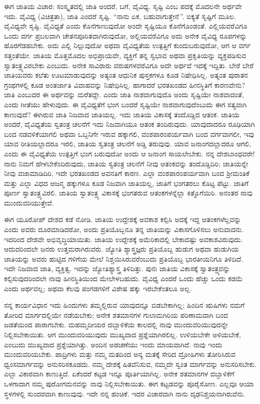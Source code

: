 ಈಗ ಜಾತಿಯ ವಿಚಾರ: ಸಂಸ್ಕೃತದಲ್ಲಿ ಜಾತಿ ಅಂದರೆ, ಬಗೆ, ವೈವಿಧ್ಯ. ಸೃಷ್ಟಿ ಎಂಬ ಪದಕ್ಕೆ ಮೊದಲನೇ ಅರ್ಥವೇ ಇದು. ವೈವಿಧ್ಯ (ವಿಚಿತ್ರತಾ), ಜಾತಿ ಎಂದರೆ ಸೃಷ್ಟಿ. ``ನಾನು ಏಕ, ಬಹುವಾಗುತ್ತೇನೆ\,''. ಐಕ್ಯತೆ ಸೃಷ್ಟಿಗೆ ಮೂಲ. ವೈವಿಧ್ಯವೇ ಸೃಷ್ಟಿ. ವೈವಿಧ್ಯತೆ ಎಂದು ಕೊನೆಗಾಣುವುದೋ ಅಂದೇ ಸೃಷ್ಟಿಯೂ ಕೊನೆಗೊಂಡಂತೆ. ಎಲ್ಲಿಯವರೆವಿಗೂ ಒಂದು ವರ್ಗ  ಪ್ರಬಲವಾಗಿ ಚೇತನಪೂರಿತವಾಗಿರುವುದೋ, ಅಲ್ಲಿಯವರೆವಿಗೂ ಅದು ಅನೇಕ ವೈವಿಧ್ಯ ರೂಪಗಳನ್ನು ಹೊರಗೆಡಹಬೇಕು. ಅದು ಎಲ್ಲಿ ನಿಲ್ಲುವುದೋ ಅಥವಾ ವೈವಿಧ್ಯತೆಯ ಉತ್ಪತ್ತಿಗೆ ಕುಂದುಬರುವುದೋ, ಆಗ ಆ ವರ್ಗ ಸತ್ತಂತೆಯೇ. ಜಾತಿಯ ಮೊತ್ತಮೊದಲ ಅಭಿಪ್ರಾಯವೇ, ವ್ಯಕ್ತಿಗೆ ತನ್ನ ಸ್ವಭಾವ ಅಥವಾ ಪ್ರಕೃತಿಯನ್ನು ವ್ಯಕ್ತಪಡಿಸುವ ಸ್ವಾತಂತ್ರ್ಯವಿರಬೇಕು ಎಂಬುದು. ಅನೇಕ ಸಾವಿರಾರು ವರುಷಗಳವರೆವಿಗೂ ಅದೇ ಅರ್ಥವೆ ಇದಕ್ಕೆ ಇದ್ದಿತು. ಬೇರೆ ಬೇರೆ ಜಾತಿಯವರು ಕಲೆತು ಊಟಮಾಡುವುದನ್ನು ಅತ್ಯಂತ ಆಧುನಿಕ ಪುಸ್ತಕಗಳೂ ಕೂಡ ನಿಷೇಧಿಸಿಲ್ಲ. ಅತ್ಯಂತ ಪುರಾತನ ಗ್ರಂಥಗಳಲ್ಲಿ ಕೂಡ ಅಂತರ್ಜಾತಿ ವಿವಾಹವನ್ನು ನಿಷೇಧಿಸಿಲ್ಲ. ಹಾಗಾದರೆ ಭರತಖಂಡದ ಹೀನಸ್ಥಿತಿಗೆ ಕಾರಣವೇನು? ಜಾತಿ ಎಂಬುದರ ಈ ಅರ್ಥವನ್ನು ಮರೆತದ್ದೇ. ಎಂದು ಜಾತಿ ನಾಶವಾಗುವುದೊ ಅಂದು ಸೃಷ್ಟಿಯೇ ನಾಶವಾದಂತೆ, ಎಂದು ಗೀತೆಯು ಹೇಳುವುದು. ಈ ವೈವಿಧ್ಯತೆಗೆ ಭಂಗ ಬಂದರೆ ಸೃಷ್ಟಿಯೇ ನಾಶವಾಗುವುದೆಂಬುದು ಈಗ ಸತ್ಯವಾಗಿ ಕಾಣುವುದೆ? ಈಗಿರುವ ಜಾತಿ ನಿಜವಾದ ಜಾತಿಯಲ್ಲ. ಇದು ಜಾತಿಯ ವಿಕಾಸಕ್ಕೆ ತಂದೊಡ್ಡಿದ ಆತಂಕ. ಜಾತಿಯ ಅಂದರೆ, ವೈವಿಧ್ಯತೆಯ ಸ್ವತಂತ್ರ ಚಲನೆಗೆ ಇದು ನಿಜವಾಗಿಯೂ ಆತಂಕ ತಂದಿರುವುದು. ಯಾವುದಾದರೂ ರೂಢಿಯಾಗಿ ಬಂದ ನಡವಳಿಕೆಯಾಗಲಿ ಅಥವಾ ಒಬ್ಬನಿಗೇ ಇರುವ ಹಕ್ಕಾಗಲಿ, ವಂಶಪಾರಂಪರ್ಯವಾಗಿ ಬಂದ ವರ್ಗವಾಗಲೀ, ಇವು ಯಾವ ರೀತಿಯಲ್ಲಾದರೂ ಇರಲಿ, ಜಾತಿಯ ಸ್ವತಂತ್ರ ಚಲನೆಗೆ ಅಡ್ಡಿ ತರುವುವು. ಯಾವ ಜನಾಂಗದಲ್ಲಾದರೂ ಆಗಲಿ, ಎಂದು ಈ ವೈವಿಧ್ಯತೆಯ ಉತ್ಪತ್ತಿಗೆ ಭಂಗ ಬರುವುದೋ ಅಂದು ಆ ಜನಾಂಗ ಸಾಯಲೇಬೇಕು. ನನ್ನ ದೇಶಬಾಂಧವರೇ! ನಾನು ನಿಮಗೆ ಹೇಳಬೇಕೆಂದಿರುವುದು, ಜಾತಿಯ ಸ್ವತಂತ್ರ ಚಲನೆಗೆ ನೀವು ಆತಂಕವನ್ನು ತಂದೊಡ್ಡಿದಿರಿ; ಜಾತಿಯನ್ನೇ ನೀವು ವಜಾಮಾಡಿದಿರಿ. ಇದೇ ಭರತಖಂಡದ ಅವನತಿಗೆ ಕಾರಣ. ಎಲ್ಲಾ ವಂಶಪಾರಂಪರ್ಯವಾಗಿ ಬಂದ ಶ‍್ರೀಮಂತಿಕೆ ಮತ್ತು ಎಲ್ಲಾ ವಿಧದ ಆಜನ್ಮ ಹಕ್ಕುಗಳೂ ಕೂಡ ನಿಜವಾಗಿ ಜಾತಿಯಲ್ಲ, ಜಾತಿಗೆ ಭಂಗತರಲು ಕೊಟ್ಟ ಪೆಟ್ಟು. ಜಾತಿಗೆ ಪೂರ್ಣ ಸ್ವಾತಂತ್ರ್ಯವಿರಲಿ. ಜಾತಿಯ ಸ್ವಾತಂತ್ರ್ಯ ವಿಕಾಸಕ್ಕೆ ಭಂಗತರುವ ಆತಂಕಗಳನ್ನೆಲ್ಲಾ ಕಿತ್ತೊಗೆಯಿರಿ. ಅನಂತರ ನಾವು ಮುಂದುವರಿಯುತ್ತೇವೆ.

ಈಗ ಯೂರೋಪ್ ದೇಶದ ಕಡೆ ನೋಡಿ. ಜಾತಿಯ ಉದ್ದೇಶಕ್ಕೆ ಅವಕಾಶ ಕಲ್ಪಿಸಿ ಅದಕ್ಕೆ ಇದ್ದ ಆತಂಕಗಳೆಲ್ಲವನ್ನು ಎಂದು ಅವರು ದೂರಮಾಡಿದರೋ, ಅಂದು ಪ್ರತಿಯೊಬ್ಬನೂ ತನ್ನ ಜಾತಿಯನ್ನು ವಿಕಾಸಗೊಳಿಸಲು ಅನುವಾದನು. ಇದರಿಂದ ದೇಶವೇ ಅಭಿವೃದ್ಧಿಯಾಯಿತು. ಜಾತಿಯ ಉದ್ದೇಶಕ್ಕೆ ಅಮೆರಿಕಾದಲ್ಲಿ ಬೇಕಾದಷ್ಟು ಅವಕಾಶವಿರುವುದು. ಆದುದರಿಂದಲೇ ಜನರು ಉತ್ತಮರಾಗಿರುವರು. ಜ್ಯೋತಿ ಶ್ಯಾಸ್ತ್ರಜ್ಞರು ಪ್ರತಿಯೊಬ್ಬ ಹುಡುಗ ಅಥವಾ ಹುಡುಗಿಯ ಜಾತಿಯನ್ನು ಅವರು ಹುಟ್ಟಿದ ಗಳಿಗೆಯ ಮೇಲೆ ನಿಶ್ಚಯಿಸಿರುವರೆಂಬುದು ಪ್ರತಿಯೊಬ್ಬ ಭಾರತೀಯನಿಗೂ ತಿಳಿದಿದೆ. ಇದೇ ನಿಜವಾದ ಜಾತಿ, ವ್ಯಕ್ತಿತ್ವ. ಇದನ್ನು ಜ್ಯೋತಿಶ್ಯಾಸ್ತ್ರ ತಿಳಿದಿತ್ತು. ಪುನಃ ಜಾತಿಯ ವಿಕಾಸಕ್ಕೆ ಸ್ವಾತಂತ್ರ್ಯವನ್ನು ಕಲ್ಪಿಸುವುದರಿಂದಲೇ ನಾವು ಹೀನಸ್ಥಿತಿಯಿಂದ ಮೇಲೇಳಬಹುದು. ವೈವಿಧ್ಯ ಎಂದರೆ ಒಂದು ಹೆಚ್ಚು ಒಂದು ಕಡಮೆ ಎಂದು ಅರ್ಥವಲ್ಲ; ಅಥವಾ ಕೆಲವು ಪಂಗಡಗಳಿಗೆ ವಿಶೇಷ ಹಕ್ಕು ಇರಬೇಕೆಂತಲೂ ಅಲ್ಲ.

ನನ್ನ ಕಾರ್ಯವಿಧಾನ ಇದು\enginline{-} ಹಿಂದುಗಳು ತಮ್ಮಲ್ಲಿರುವ ಯಾವುದನ್ನೂ ಬಿಡಬೇಕಾಗಿಲ್ಲ; ಹಿಂದಿನ ಋಷಿಗಳು ನಮಗೆ ತೋರಿದ ಮಾರ್ಗದಲ್ಲಿಯೇ ನಡೆಯಬೇಕು; ಅನೇಕ ಶತಮಾನಗಳ ಗುಲಾಮಗಿರಿಯ ಪರಿಣಾಮವಾಗಿ ಬಂದ ಜಡತೆಯಿಂದ ಪಾರಾಗಬೇಕು. ಮಹಮ್ಮದೀಯರ ದಬ್ಬಾಳಿಕೆಯ ಕಾಲದಲ್ಲಿ ನಾವು ಮುಂದುವರಿಯುವುದನ್ನೇ ನಿಲ್ಲಿಸಬೇಕಾಯಿತು. ಆಗ ಮುಂದುವರಿಯುವುದು ಮುಖ್ಯವಾದ ಪ್ರಶ್ನೆಯಾಗಿರಲಿಲ್ಲ. ಉಳಿಯಬೇಕೇ ಅಳಿಯಬೇಕೆ, ಎಂಬುದು ಮುಖ್ಯವಾದ ಪ್ರಶ್ನೆಯಾಗಿತ್ತು. ಅಂದಿನ ಅಡಚಣೆಯು ಇಂದು ಮಾಯವಾಗಿದೆ. ನಾವು ಇಂದು ಮುಂದುವರಿಯಬೇಕು. ಪಾದ್ರಿಗಳು ಮತ್ತು ನಮ್ಮ ಮತದಿಂದ ಅನ್ಯ ಮತಕ್ಕೆ ಸೇರಿದ ದ್ರೋಹಿಗಳು ತೋರಿಸಿರುವ ಧ್ವಂಸಮಾರ್ಗವನ್ನು ಅನುಸರಿಸಕೂಡದು. ನಮ್ಮ ದೇಶಕ್ಕೆ ಹಿತವೆನಿಸುವ, ನಮ್ಮದೇ ಸ್ವಂತ ಮಾರ್ಗವನ್ನು ಅನುಸರಿಸಬೇಕು. ಎಲ್ಲಾ ವಿಕಾರವಾಗಿ ಕಾಣುತ್ತಿದೆ. ಏಕೆಂದರೆ ಕಟ್ಟಡ ಇನ್ನೂ ಪೂರ್ತಿಯಾಗಿಲ್ಲ. ಅನೇಕ ಶತಮಾನಗಳ ದಬ್ಬಾಳಿಕೆಗೆ ಒಳಗಾದಾಗ ನಮ್ಮ ಪುರೋಗಮನವನ್ನು ನಾವು ನಿಲ್ಲಿಸಬೇಕಾಯಿತು. ಈಗ ಕಟ್ಟಡವನ್ನು ಪೂರೈಸೋಣ. ಎಲ್ಲವೂ ಆಯಾ ಸ್ಥಳಗಳಲ್ಲಿ ಸುಂದರವಾಗಿ ಕಾಣುವುವು. ಇದೇ ನನ್ನ ಹಂಚಿಕೆ. ಇದರ ವಿಚಾರವಾಗಿ ನಾನು ದೃಢನಿಶ್ಚಯನಾಗಿರುವೆನು.

